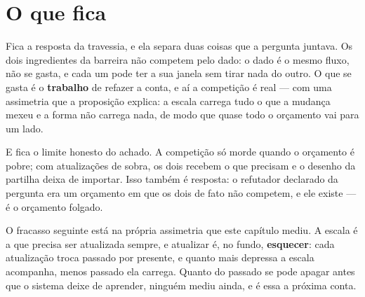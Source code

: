 \section{O que fica}

Fica a resposta da travessia, e ela separa duas coisas que a pergunta juntava. Os dois ingredientes
da barreira não competem pelo dado: o dado é o mesmo fluxo, não se gasta, e cada um pode ter a sua
janela sem tirar nada do outro. O que se gasta é o \textbf{trabalho} de refazer a conta, e aí a
competição é real --- com uma assimetria que a proposição explica: a escala carrega tudo o que a
mudança mexeu e a forma não carrega nada, de modo que quase todo o orçamento vai para um lado.

E fica o limite honesto do achado. A competição só morde quando o orçamento é pobre; com
atualizações de sobra, os dois recebem o que precisam e o desenho da partilha deixa de importar.
Isso também é resposta: o refutador declarado da pergunta era um orçamento em que os dois de fato
não competem, e ele existe --- é o orçamento folgado.

O fracasso seguinte está na própria assimetria que este capítulo mediu. A escala é a que precisa ser
atualizada sempre, e atualizar é, no fundo, \textbf{esquecer}: cada atualização troca passado por
presente, e quanto mais depressa a escala acompanha, menos passado ela carrega. Quanto do passado se
pode apagar antes que o sistema deixe de aprender, ninguém mediu ainda, e é essa a próxima conta.
